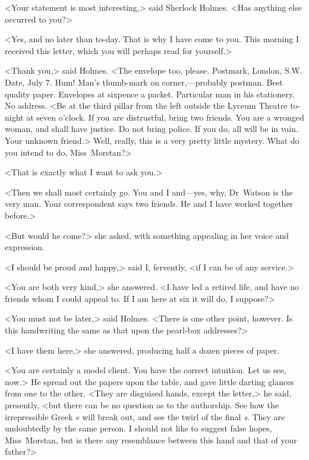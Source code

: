 <Your statement is most interesting,> said Sherlock Holmes. <Has anything else occurred to you?>

<Yes, and no later than to-day. That is why I have come to you. This morning I received this letter, which you will perhaps read for yourself.>

<Thank you,> said Holmes. <The envelope too, please. Postmark, London, S\@.W\@. Date, July 7. Hum! Man's thumb-mark on corner,—probably postman. Best quality paper. Envelopes at sixpence a packet. Particular man in his stationery. No address. <Be at the third pillar from the left outside the Lyceum Theatre to-night at seven o'clock. If you are distrustful, bring two friends. You are a wronged woman, and shall have justice. Do not bring police. If you do, all will be in vain. Your unknown friend.> Well, really, this is a very pretty little mystery. What do you intend to do, Miss~Morstan?>

<That is exactly what I want to ask you.>

<Then we shall most certainly go. You and I and—yes, why, Dr~Watson is the very man. Your correspondent says two friends. He and I have worked together before.>

<But would he come?> she asked, with something appealing in her voice and expression.

<I should be proud and happy,> said I, fervently, <if I can be of any service.>

<You are both very kind,> she answered. <I have led a retired life, and have no friends whom I could appeal to. If I am here at six it will do, I suppose?>

<You must not be later,> said Holmes. <There is one other point, however. Is this handwriting the same as that upon the pearl-box addresses?>

<I have them here,> she answered, producing half a dozen pieces of paper.

<You are certainly a model client. You have the correct intuition. Let us see, now.> He spread out the papers upon the table, and gave little darting glances from one to the other. <They are disguised hands, except the letter,> he said, presently, <but there can be no question as to the authorship. See how the irrepressible Greek \textit{e} will break out, and see the twirl of the final \textit{s}. They are undoubtedly by the same person. I should not like to suggest false hopes, Miss~Morstan, but is there any resemblance between this hand and that of your father?>

